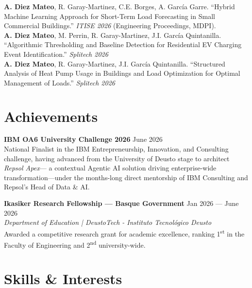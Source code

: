 \documentclass[10pt,a4paper]{article}
\newcommand{\cvheader}[2]{\textbf{#1} \hfill #2\\}
\begin{document}
{\small
\textbf{A. Diez Mateo}, R. Garay-Martinez, C.E. Borges, A. García Garre. ``Hybrid Machine Learning Approach for Short-Term Load Forecasting in Small Commercial Buildings.'' \textit{ITISE 2026} (Engineering Proceedings, MDPI).\\[1pt]
\textbf{A. Diez Mateo}, M. Perrin, R. Garay-Martinez, J.I. García Quintanilla. ``Algorithmic Thresholding and Baseline Detection for Residential EV Charging Event Identification.'' \textit{Splitech 2026}\\[1pt]
\textbf{A. Diez Mateo}, R. Garay-Martinez, J.I. García Quintanilla. ``Structured Analysis of Heat Pump Usage in Buildings and Load Optimization for Optimal Management of Loads.'' \textit{Splitech 2026}

\section{Achievements}

\cvheader{IBM OA6 University Challenge 2026}{June 2026}
National Finalist in the IBM Entrepreneurship, Innovation, and Consulting challenge, having advanced from the University of Deusto stage to architect \textit{Repsol Apex}--- a contextual Agentic AI solution driving enterprise-wide transformation—under the months-long direct mentorship of IBM Consulting and Repsol's Head of Data \& AI.

\cvheader{Ikasiker Research Fellowship --- Basque Government}{Jan 2026 --- June 2026}
\textit{Department of Education | DeustoTech - Instituto Tecnológico Deusto}\\[2pt]
Awarded a competitive research grant for academic excellence, ranking 1\textsuperscript{st} in the Faculty of Engineering and 2\textsuperscript{nd} university-wide.

\section{Skills \& Interests}

}
\end{document}
